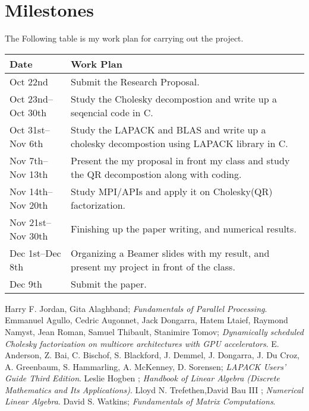 \documentclass{article}
\begin{document}
\section{Milestones}

The Following table is my work plan for carrying out the project.
\begin{center}
    \begin{tabular}{ | l |p{5cm} |}
    \hline
    Date & Work Plan \\ \hline
		Oct 22nd & Submit the Research Proposal.\\\hline
		Oct 23nd--Oct 30th  & Study the Cholesky decompostion and write up a seqencial code in C.\\\hline
    Oct 31st--Nov 6th & Study the LAPACK and BLAS and write up a cholesky decompostion using LAPACK library in C. \\\hline
    Nov 7th--Nov 13th& Present the my proposal in front my class and study the QR decompostion along with coding.\\\hline
    Nov 14th--Nov 20th & Study MPI/APIs and apply it on Cholesky(QR) factorization.\\\hline
		Nov 21st--Nov 30th & Finishing up the paper writing, and numerical results.\\\hline
		    Dec 1st--Dec 8th & Organizing a Beamer slides with my result, and present my project in front of the class.\\\hline
				Dec 9th& Submit the paper. \\\hline

    
    \end{tabular}
\end{center}

 \begin{thebibliography}{9}
     Harry F. Jordan, Gita Alaghband; \textit{Fundamentals of Parallel Processing}.  
   Emmanuel Agullo, Cedric Augonnet, Jack Dongarra, Hatem Ltaief, Raymond Namyst,
Jean Roman, Samuel Thibault, Stanimire Tomov; \textit{Dynamically scheduled Cholesky
factorization on multicore architectures with GPU accelerators}.  
  E. Anderson,
Z. Bai,
C. Bischof,
S. Blackford,
J. Demmel,
J. Dongarra,
J. Du Croz,
A. Greenbaum,
S. Hammarling,
A. McKenney,
D. Sorensen; \textit{LAPACK Users' Guide 
Third Edition}.  
    Leslie Hogben  ; \textit{Handbook of Linear Algebra (Discrete Mathematics and Its Applications)}. 
   Lloyd N. Trefethen,David Bau III ; \textit{Numerical Linear Algebra}.  
    David S. Watkins; \textit{Fundamentals of Matrix Computations}.  
\end{thebibliography}
\end{document}
